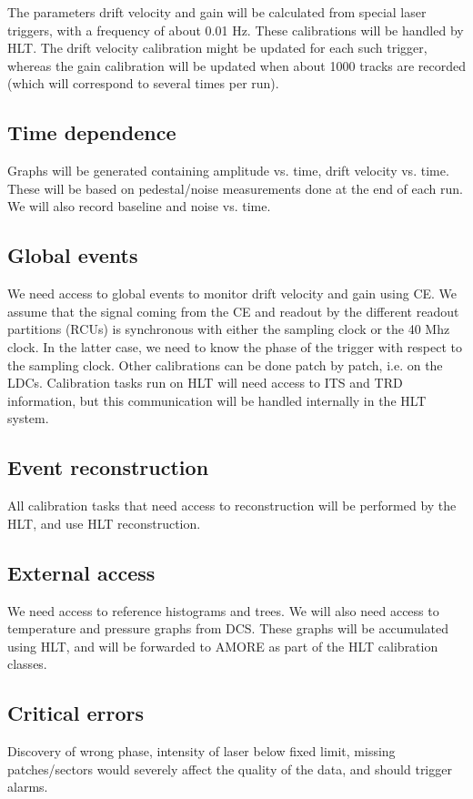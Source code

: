 \documentclass[a4paper,12pt]{article}
\begin{document}
The parameters drift velocity and gain will be calculated from special laser 
triggers, with a frequency of about 0.01 Hz. These calibrations will be handled 
by HLT. The drift velocity calibration might be updated for each such trigger, 
whereas the gain calibration will be updated when about 1000 tracks are recorded 
(which will correspond to several times per run).

\subsection{Time dependence}
Graphs will be generated containing amplitude vs. time, drift velocity vs. time.
These will be based on pedestal/noise measurements done at the end of each run.
 We will also record baseline and noise vs. time.

\subsection{Global events}
We need access to global events to monitor drift velocity and gain using CE. 
We assume that the signal coming from the CE and readout by the different 
readout partitions (RCUs) is synchronous with either the sampling clock or the 
40 Mhz clock. In the latter case, we need to know the phase of the trigger with 
respect to the sampling clock. Other calibrations can be done patch by patch, 
i.e. on the LDCs. Calibration tasks run on HLT will need access to ITS and TRD 
information, but this communication will be handled internally in the HLT system.

\subsection{Event reconstruction}
All calibration tasks that need access to reconstruction will be performed by
the HLT, and use HLT reconstruction.

\subsection{External access} 
We need access to reference histograms and trees. We will also need access to
temperature and pressure graphs from DCS. These graphs will be accumulated using
HLT, and will be forwarded to AMORE as part of the HLT calibration classes.

\subsection{Critical errors}
Discovery of wrong phase, intensity of laser below fixed limit, missing 
patches/sectors would severely affect the quality of the data, and should 
trigger alarms.
\end{document}
